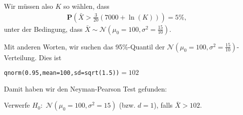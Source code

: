\documentclass[t,11pt]{beamer}
\begin{document}
\begin{frame}
	Wir müssen also $K$ so wählen, dass
	\begin{align*}
		\mathbf{P}\left(\bar{X}>\frac{3}{20}(7000+\ln(K))\right)=5\%, 
	\end{align*}
	unter der Bedingung, dass $\bar{X}\sim \mathcal{N}(\mu_0=100,\sigma^2=\frac{15}{10})$. 
	
	\vspace{0.5cm}
	
	Mit anderen Worten, wir suchen das 95\%-Quantil der $\mathcal{N}(\mu_0=100,\sigma^2=\frac{15}{10})$-Verteilung. Dies ist
	
	\begin{center}
		\texttt{qnorm(0.95,mean=100,sd=sqrt(1.5))}$=102$
	\end{center}

	Damit haben wir den Neyman-Pearson Test gefunden:
	
	\vspace{0.5cm}
	
	Verwerfe $H_0:$ $\mathcal{N}(\mu_0=100,\sigma^2=15)$ (bzw. $d=1$), falls $\bar{X}>102$.
	
\end{frame}
\end{document}
